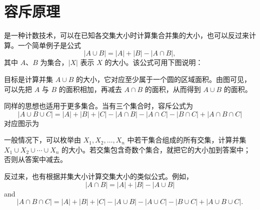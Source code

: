 \section{容斥原理}


是一种计数技术，可以在已知各交集大小时计算集合并集的大小，也可以反过来计算。一个简单例子是公式
\[ |A \cup B| = |A| + |B| - |A \cap B|,\]
其中 $A$、$B$ 为集合，$|X|$ 表示 $X$ 的大小。该公式可用下图说明：

\begin{center}
\end{center}

目标是计算并集 $A \cup B$ 的大小，它对应至少属于一个圆的区域面积。由图可见，可以先把 $A$ 与 $B$ 的面积相加，再减去 $A \cap B$ 的面积，从而得到 $A \cup B$ 的面积。

同样的思想也适用于更多集合。当有三个集合时，容斥公式为
\[ |A \cup B \cup C| = |A| + |B| + |C| - |A \cap B|  - |A \cap C|  - |B \cap C| + |A \cap B \cap C| \]
对应图示为

\begin{center}
\end{center}

一般情况下，可以枚举由 $X_1,X_2,\ldots,X_n$ 中若干集合组成的所有交集，计算并集 $X_1 \cup X_2 \cup \cdots \cup X_n$ 的大小。若交集包含奇数个集合，就把它的大小加到答案中；否则从答案中减去。

反过来，也有根据并集大小计算交集大小的类似公式。例如，
\[ |A \cap B| = |A| + |B| - |A \cup B|\]
and
\[ |A \cap B \cap C| = |A| + |B| + |C| - |A \cup B|  - |A \cup C|  - |B \cup C| + |A \cup B \cup C| .\]

